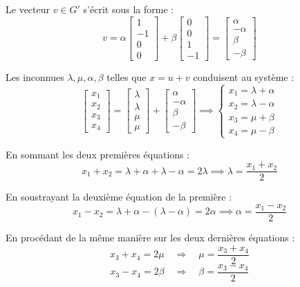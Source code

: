 \documentclass[10pt,a4paper]{article}
\begin{document}
Le vecteur \( v \in G' \) s'écrit sous la forme :
\[
v = \alpha \begin{bmatrix} 1 \\ -1 \\ 0 \\ 0 \end{bmatrix} + \beta \begin{bmatrix} 0 \\ 0 \\ 1 \\ -1 \end{bmatrix}
= \begin{bmatrix} \alpha \\ -\alpha \\ \beta \\ -\beta \end{bmatrix}
\]

Les inconnues \( \lambda, \mu, \alpha, \beta \) telles que \( x = u + v \) conduisent au système :
\[
\begin{bmatrix} x_1 \\ x_2 \\ x_3 \\ x_4 \end{bmatrix}
=
\begin{bmatrix} \lambda \\ \lambda \\ \mu \\ \mu \end{bmatrix}
+
\begin{bmatrix} \alpha \\ -\alpha \\ \beta \\ -\beta \end{bmatrix}
\implies
\begin{cases}
x_1 = \lambda + \alpha \\
x_2 = \lambda - \alpha \\
x_3 = \mu + \beta \\
x_4 = \mu - \beta
\end{cases}
\]

En sommant les deux premières équations :
\[
x_1 + x_2 = \lambda + \alpha + \lambda - \alpha = 2\lambda
\implies
\lambda = \frac{x_1 + x_2}{2}
\]

En soustrayant la deuxième équation de la première :
\[
x_1 - x_2 = \lambda + \alpha - (\lambda - \alpha) = 2\alpha
\implies
\alpha = \frac{x_1 - x_2}{2}
\]

En procédant de la même manière sur les deux dernières équations :
\[
x_3 + x_4 = 2\mu \quad \Rightarrow \quad \mu = \frac{x_3 + x_4}{2}
\]
\[
x_3 - x_4 = 2\beta \quad \Rightarrow \quad \beta = \frac{x_3 - x_4}{2}
\]
\end{document}
